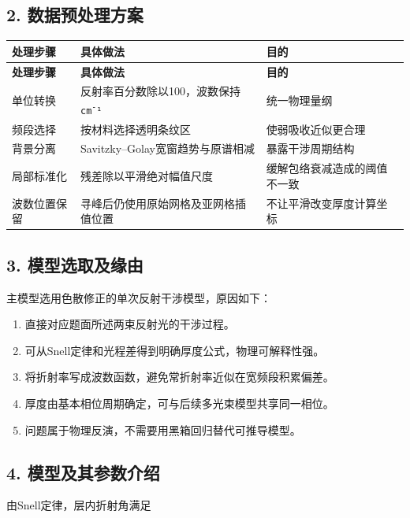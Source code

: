 \documentclass[11pt,a4paper]{ctexart}
\begin{document}
\subsection*{2. 数据预处理方案}
\begin{center}
\scriptsize
\begin{longtable}{|>{\raggedright\arraybackslash}p{}|>{\raggedright\arraybackslash}p{}|>{\raggedright\arraybackslash}p{}|}
\hline
\textbf{处理步骤} & \textbf{具体做法} & \textbf{目的} \\ \hline
\endfirsthead
\hline \textbf{处理步骤} & \textbf{具体做法} & \textbf{目的} \\ \hline
\endhead
单位转换 & 反射率百分数除以100，波数保持\texttt{cm\textsuperscript{-}¹} & 统一物理量纲 \\ \hline
频段选择 & 按材料选择透明条纹区 & 使弱吸收近似更合理 \\ \hline
背景分离 & Savitzky–Golay宽窗趋势与原谱相减 & 暴露干涉周期结构 \\ \hline
局部标准化 & 残差除以平滑绝对幅值尺度 & 缓解包络衰减造成的阈值不一致 \\ \hline
波数位置保留 & 寻峰后仍使用原始网格及亚网格插值位置 & 不让平滑改变厚度计算坐标 \\ \hline
\end{longtable}
\normalsize
\end{center}
\subsection*{3. 模型选取及缘由}
主模型选用色散修正的单次反射干涉模型，原因如下：


\begin{enumerate}
\item 直接对应题面所述两束反射光的干涉过程。
\item 可从Snell定律和光程差得到明确厚度公式，物理可解释性强。
\item 将折射率写成波数函数，避免常折射率近似在宽频段积累偏差。
\item 厚度由基本相位周期确定，可与后续多光束模型共享同一相位。
\item 问题属于物理反演，不需要用黑箱回归替代可推导模型。
\end{enumerate}
\subsection*{4. 模型及其参数介绍}
由Snell定律，层内折射角满足
\end{document}
